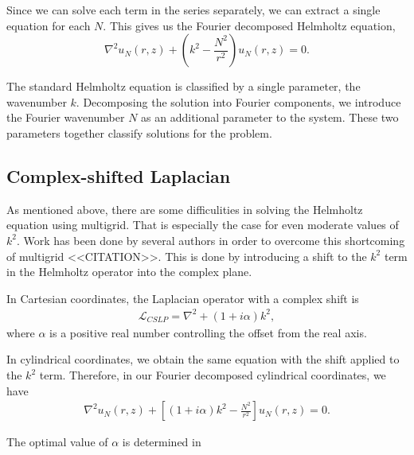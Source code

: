 Since we can solve each term in the series separately, we can extract a single equation for each $N$.
This gives us the Fourier decomposed Helmholtz equation,
\begin{equation}
	\nabla^2 u_N(r,z) + (k^2 - \frac{N^2}{r^2})u_N(r,z) = 0. \label{eqn:fhh}
\end{equation}

The standard Helmholtz equation is classified by a single parameter, the wavenumber $k$.
Decomposing the solution into Fourier components, we introduce the Fourier wavenumber $N$ as an additional parameter to the system.
These two parameters together classify solutions for the problem.








\subsection{Complex-shifted Laplacian}

As mentioned above, there are some difficulities in solving the Helmholtz equation using multigrid.
That is especially the case for even moderate values of $k^2$.
Work has been done by several authors in order to overcome this shortcoming of multigrid <<CITATION>>.
This is done by introducing a shift to the $k^2$ term in the Helmholtz operator into the complex plane.

In Cartesian coordinates, the Laplacian operator with a complex shift is
\begin{align}
	\mathcal{L}_{CSLP} = \nabla^2 + (1 + i \alpha ) k^2,  \label{eqn:cslp}
\end{align}
where $\alpha$ is a positive real number controlling the offset from the real axis.

In cylindrical coordinates, we obtain the same equation with the shift applied to the $k^2$ term.
Therefore, in our Fourier decomposed cylindrical coordinates, we have
\begin{align}
	\nabla^2 u_N(r,z) + \left[ \left( 1 + i \alpha \right) k^2 - \frac{N^2}{r^2} \right] u_N(r,z) = 0.
\end{align}


The optimal value of $\alpha$ is determined in \cite{cslp2}












